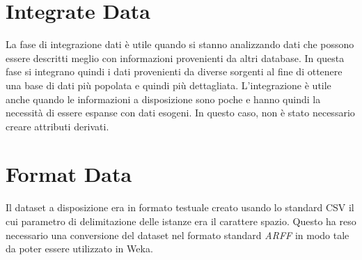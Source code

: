 \section{Integrate Data}
La fase di integrazione dati è utile quando si stanno analizzando dati che possono essere descritti meglio con informazioni provenienti da altri database. In questa fase si integrano quindi i dati provenienti da diverse sorgenti al fine di ottenere una base di dati più popolata e quindi più dettagliata. L'integrazione è utile anche quando le informazioni a disposizione sono poche e hanno quindi la necessità di essere espanse con dati esogeni.
In questo caso, non è stato necessario creare attributi derivati.

\section{Format Data}
Il dataset a disposizione era in formato testuale creato usando lo standard CSV il cui parametro di delimitazione delle istanze era il carattere spazio. Questo ha reso necessario una conversione del dataset nel formato standard \emph{ARFF} in modo tale da poter essere utilizzato in Weka.
